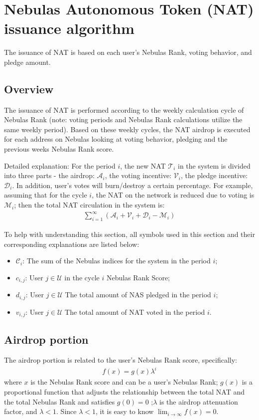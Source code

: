 \section{Nebulas Autonomous Token (NAT) ​​issuance algorithm}

The issuance of NAT is based on each user's Nebulas Rank, voting behavior, and pledge amount.

\subsection{Overview}
The issuance of NAT is performed according to the weekly calculation cycle of Nebulas Rank (note: voting periods and Nebulas Rank calculations utilize the same weekly period). Based on these weekly cycles, the NAT airdrop is executed for each address on Nebulas looking at voting behavior, pledging and the previous weeks Nebulas Rank score.

Detailed explanation: 
For the period $i$, the new NAT $\mathcal{T}_i$ in the system is divided into three parts - the airdrop: $\mathcal{A}_i$, the voting incentive: $\mathcal{V}_i$, the pledge incentive: $\mathcal{D}_i$.
In addition, user's votes will burn/destroy a certain percentage. For example, assuming that for the cycle $i$, the NAT on the network is reduced due to voting is $\mathcal{M}_i$; then the total NAT circulation in the system is:
\begin{align}
\sum_{i=1}^{\infty} (\mathcal{A}_i + \mathcal{V}_i + \mathcal{D}_i - \mathcal{M}_i)
\end{align}

To help with understanding this section, all symbols used in this section and their corresponding explanations are listed below:
\begin{itemize}
\item $\mathcal{C}_i$: The sum of the Nebulas indices for the system in the period $i$;
\item $c_{i,j}$: User $j \in \mathcal{U}$ in the cycle $i$ Nebulas Rank Score;
\item $d_{i,j}$: User $j \in \mathcal{U}$ The total amount of NAS pledged in the period $i$;
\item $v_{i,j}$: User $j \in \mathcal{U}$ The total amount of NAT voted in the period $i$.
\end{itemize}

\subsection{Airdrop portion}
The airdrop portion is related to the user's Nebulas Rank score, specifically:
\begin{align}
    f(x) = g(x)\lambda^i
\end{align}
\noindent where $x$ is the Nebulas Rank score and can be a user's Nebulas Rank; $g(x)$ is a proportional function that adjusts the relationship between the total NAT and the total Nebulas Rank and satisfies $g(0) = 0$ ;$\lambda$ is the airdrop attenuation factor, and $\lambda < 1$.
Since $\lambda < 1$, it is easy to know $\lim_{i\to \infty}f(x) = 0$.

